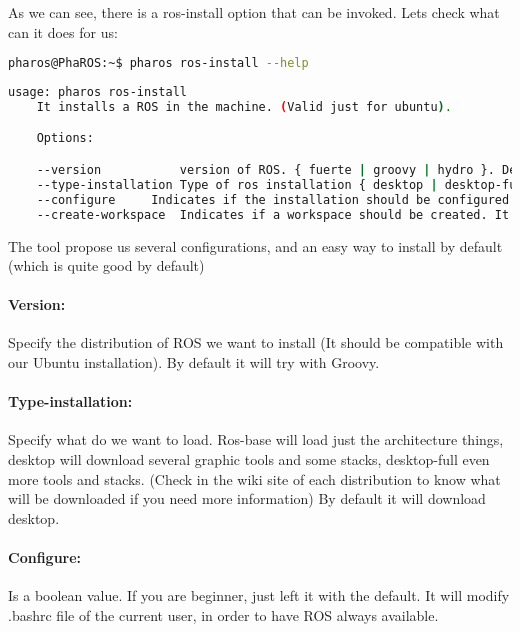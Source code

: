 \documentclass[a4paper,10pt,twoside]{book}
\begin{document}
				As we can see, there is a ros-install option that can be invoked. Lets check what can it does for us:
				
				\begin{lstlisting}[language=bash,title={\installationTool{} for ROS installation}]
						pharos@PhaROS:~$ pharos ros-install --help
				\end{lstlisting}
				
				
				
				\begin{lstlisting}[language=bash,title={\installationTool{} for ROS installation}]
	usage: pharos ros-install 
	It installs a ROS in the machine. (Valid just for ubuntu).

	Options: 

	--version			version of ROS. { fuerte | groovy | hydro }. Default: groovy.
	--type-installation	Type of ros installation { desktop | desktop-full | ros-base }. Default: desktop.
	--configure		Indicates if the installation should be configured (modifiy .bashrc file ).{true|false} Default: true.
	--create-workspace	Indicates if a workspace should be created. It will create a workspace at ~/ros/worskpace. { true|false }. Default: true.

				\end{lstlisting}
				
				
				The tool propose us several configurations, and an easy way to install by default (which is quite good by default)
				
				\paragraph{Version:} Specify the distribution of ROS we want to install (It should be compatible with our Ubuntu installation). By default it will try with Groovy.
				\paragraph{Type-installation:} Specify what do we want to load. Ros-base will load just the architecture things, desktop will download several graphic tools and some stacks, desktop-full even more tools and stacks. (Check in the wiki site of each distribution to know what will be downloaded if you need more information) By default it will download desktop. 
				
				\paragraph{Configure:}Is a boolean value. If you are beginner, just left it with the default. It will modify .bashrc file of the current user, in order to have ROS always available. 
\end{document}
